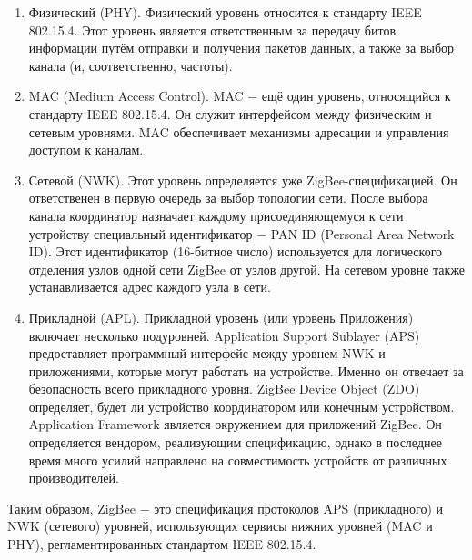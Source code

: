 	\begin{enumerate}
		\item Физический (PHY). Физический уровень относится к стандарту IEEE 802.15.4. Этот уровень
		является ответственным за передачу битов информации путём отправки и получения пакетов
		данных, а также за выбор канала (и, соответственно, частоты).
		\item MAC (Medium Access Control). MAC $-$ ещё один уровень, относящийся к стандарту IEEE 802.15.4.
		Он служит интерфейсом между физическим и сетевым уровнями. MAC обеспечивает механизмы
		адресации и управления доступом к каналам.
		\item Сетевой (NWK). Этот уровень определяется уже ZigBee-спецификацией. Он ответственен
		в первую очередь за выбор топологии сети. После выбора канала координатор назначает каждому
		присоединяющемуся к сети устройству специальный идентификатор $-$ PAN ID (Personal Area Network ID).
		Этот идентификатор (16-битное число) используется для логического отделения узлов одной сети 
		ZigBee от узлов другой. На сетевом уровне также устанавливается адрес каждого узла в сети.
		\item Прикладной (APL). Прикладной уровень (или уровень Приложения) включает несколько
		подуровней. Application Support Sublayer (APS) предоставляет программный интерфейс между 
		уровнем NWK и приложениями, которые могут работать на устройстве. Именно он отвечает за
		безопасность всего прикладного уровня. ZigBee Device Object (ZDO) определяет, будет ли устройство
		координатором или конечным устройством. Application Framework является окружением для
		приложений ZigBee. Он определяется вендором, реализующим спецификацию, однако в последнее
		время много усилий направлено на совместимость устройств от различных производителей.
	\end{enumerate}

	Таким образом, ZigBee $-$ это спецификация протоколов APS (прикладного) и NWK (сетевого) уровней,
	использующих сервисы нижних уровней (MAC и PHY), регламентированных стандартом IEEE 802.15.4. \newline
	
